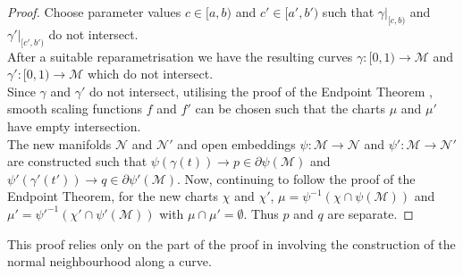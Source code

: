 \documentclass[pdflatex,sn-mathphys-num]{sn-jnl}
\theoremstyle{definition}
\begin{document}
\begin{proof}
    Choose parameter values $c \in [a,b)$ and $c' \in [a',b')$ such that $\gamma|_{[c,b)}$ and $\gamma'|_{[c',b')}$ do not intersect.\\

    After a suitable reparametrisation we have the resulting curves $\gamma:[0,1) \rightarrow \mathcal{M}$ and $\gamma':[0,1) \rightarrow \mathcal{M}$ which do not intersect.\\

    Since $\gamma$ and $\gamma'$ do not intersect, utilising the proof of the Endpoint Theorem \cite{Scott_2021}, smooth scaling functions $f$ and $f'$ can be chosen such that the charts $\mu$ and $\mu'$ have empty intersection.\\

    The new manifolds $\mathcal{N}$ and $\mathcal{N}'$ and open embeddings $\psi: \mathcal{M} \rightarrow \mathcal{N}$ and $\psi': \mathcal{M} \rightarrow \mathcal{N'}$  are constructed such that $\psi(\gamma(t)) \rightarrow p \in \partial\psi(\mathcal{M})$ and $\psi'(\gamma'(t')) \rightarrow q \in \partial\psi'(\mathcal{M})$. Now, continuing to follow the proof of the Endpoint Theorem, for the new charts $\chi$ and $\chi'$, $\mu = \psi^{-1} (\chi \cap \psi(\mathcal{M}))$ and $\mu' = \psi'^{-1}(\chi' \cap \psi'(\mathcal{M}))$ with $\mu \cap \mu' = \emptyset$. Thus $p$ and $q$ are separate.
\end{proof}

    This proof relies only on the part of the proof in \cite{Scott_2021} involving the construction of the normal neighbourhood along a curve.



\end{document}
